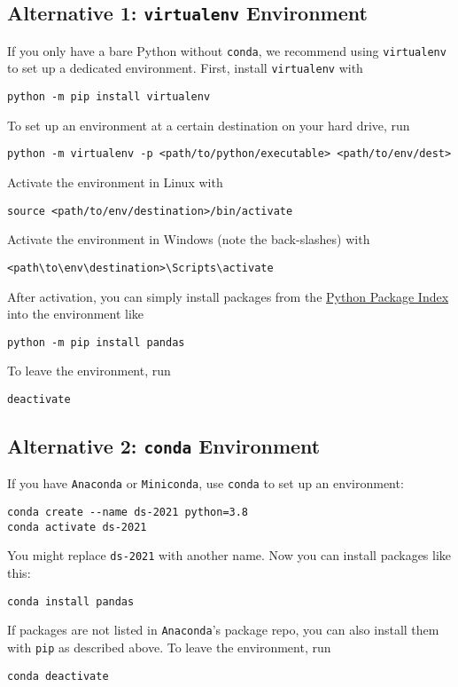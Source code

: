 \documentclass[12pt]{article}
\newcommand{\code}[1]{\textcolor{kitgreen}{\texttt{#1}}}
\begin{document}
\subsection{Alternative 1: \code{virtualenv} Environment}

If you only have a bare Python without \code{conda}, we recommend using \code{virtualenv} to set up a dedicated environment.
First, install \code{virtualenv} with
%
\begin{lstlisting}[style=cmdblock]
python -m pip install virtualenv
\end{lstlisting}
%
To set up an environment at a certain destination on your hard drive, run
%
\begin{lstlisting}[style=cmdblock]
python -m virtualenv -p <path/to/python/executable> <path/to/env/dest>
\end{lstlisting}
%
Activate the environment in Linux with
%
\begin{lstlisting}[style=cmdblock]
source <path/to/env/destination>/bin/activate
\end{lstlisting}
%
Activate the environment in Windows (note the back-slashes) with
%
\begin{lstlisting}[style=cmdblock]
<path\to\env\destination>\Scripts\activate
\end{lstlisting}
%
After activation, you can simply install packages from the \href{https://pypi.org/}{Python Package Index} into the environment like
%
\begin{lstlisting}[style=cmdblock]
python -m pip install pandas
\end{lstlisting}
%
To leave the environment, run
%
\begin{lstlisting}[style=cmdblock]
deactivate
\end{lstlisting}

\subsection{Alternative 2: \code{conda} Environment}

If you have \code{Anaconda} or \code{Miniconda}, use \code{conda} to set up an environment:
%
\begin{lstlisting}[style=cmdblock]
conda create --name ds-2021 python=3.8
conda activate ds-2021
\end{lstlisting}
%
You might replace \code{ds-2021} with another name.
Now you can install packages like this:
%
\begin{lstlisting}[style=cmdblock]
conda install pandas
\end{lstlisting}
%
If packages are not listed in \code{Anaconda}'s package repo, you can also install them with \code{pip} as described above.
To leave the environment, run
%
\begin{lstlisting}[style=cmdblock]
conda deactivate
\end{lstlisting}
\end{document}
